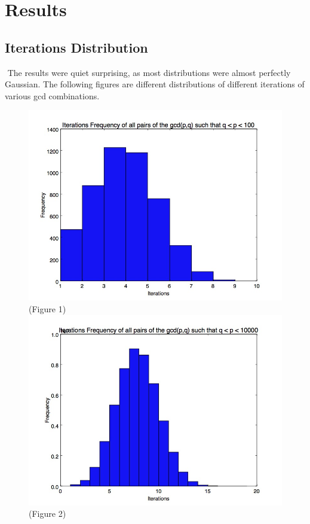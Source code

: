 \documentclass[11pt]{article}
\begin{document}
\section{Results}
\subsection{Iterations Distribution}$ $	
\indent The results were quiet surprising, as most distributions were almost perfectly Gaussian. The following figures are different distributions of different iterations of various gcd combinations.\\
	
	\begin{figure}
		
		\center \includegraphics[scale=.4]{2digit_iterationfreq.jpg}
		\center \tiny(Figure 1)\\
		\includegraphics[scale=.4]{4digit_iteration_freq.jpg}
		\center \tiny(Figure 2)
	\end{figure}
	
\end{document}
